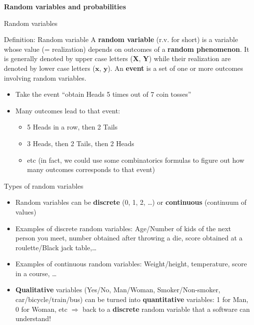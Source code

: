 \documentclass[
  ignorenonframetext,
  aspectratio=169]{beamer}
\providecommand{\tightlist}{%
  \setlength{\itemsep}{0pt}\setlength{\parskip}{0pt}}
\begin{document}
\begin{frame}{}
\protect\hypertarget{section}{}
\begin{center} \label{proba}
\LARGE{ \textbf{Random variables and probabilities} } 
\end{center}
\end{frame}

\begin{frame}{Random variables}
\protect\hypertarget{random-variables}{}
\label{rv}

\begin{block}{Definition: Random variable}
A \textbf{random variable} (r.v. for short) is a variable whose value (= realization) depends on outcomes of a \textbf{random phenomenon}. It is generally denoted by upper case letters ($\bm{X}$, $\bm{Y}$) while their realization are denoted by lower case letters ($\bm{x}$, $\bm{y}$).
An \textbf{event} is a set of one or more outcomes involving random variables.
\end{block}

\begin{itemize}
\tightlist
\item
  Take the event ``obtain Heads 5 times out of 7 coin tosses''
\item
  Many outcomes lead to that event:

  \begin{itemize}
  \tightlist
  \item
    5 Heads in a row, then 2 Tails
  \item
    3 Heads, then 2 Tails, then 2 Heads
  \item
    etc (in fact, we could use some combinatorics formulas to figure out
    how many outcomes corresponds to that event)
  \end{itemize}
\end{itemize}
\end{frame}

\begin{frame}{Types of random variables}
\protect\hypertarget{types-of-random-variables}{}
\begin{itemize}
\tightlist
\item
  Random variables can be \textbf{discrete} (0, 1, 2, \ldots) or
  \textbf{continuous} (continuum of values)
\item
  Examples of discrete random variables: Age/Number of kids of the next
  person you meet, number obtained after throwing a die, score obtained
  at a roulette/Black jack table,\ldots{}
\item
  Examples of continuous random variables: Weight/height, temperature,
  score in a course, \ldots{}
\item
  \textbf{Qualitative} variables (Yes/No, Man/Woman, Smoker/Non-smoker,
  car/bicycle/train/bus) can be turned into \textbf{quantitative}
  variables: 1 for Man, 0 for Woman, etc \(\Rightarrow\) back to a
  \textbf{discrete} random variable that a software can understand!
\end{itemize}
\end{frame}
\end{document}
